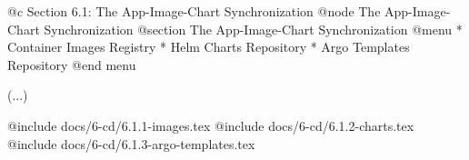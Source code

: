 @c Section 6.1: The App-Image-Chart Synchronization
@node The App-Image-Chart Synchronization
@section The App-Image-Chart Synchronization
@menu
* Container Images Registry
* Helm Charts Repository
* Argo Templates Repository
@end menu

(...)

@include docs/6-cd/6.1.1-images.tex
@include docs/6-cd/6.1.2-charts.tex
@include docs/6-cd/6.1.3-argo-templates.tex
